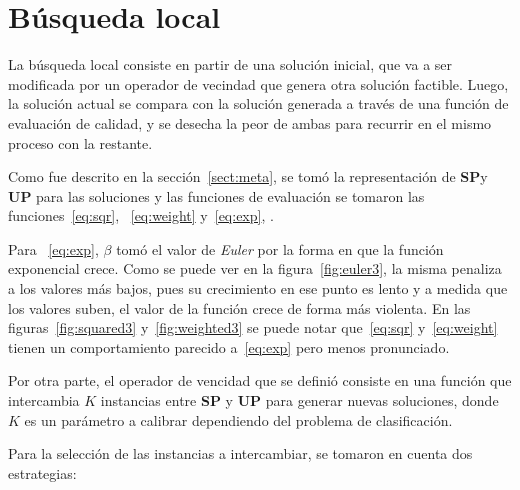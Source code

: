 \documentclass{ci5652}
\begin{document}
\section{Búsqueda local}\label{sect:ls}

La búsqueda local consiste en partir de una solución inicial, que va a ser modificada por un operador de vecindad que genera otra solución factible. Luego, la solución actual se compara con la solución generada a través de una función de evaluación de calidad, y se desecha la peor de ambas para recurrir en el mismo proceso con la restante.

Como fue descrito en la sección~\ref{sect:meta}, se tomó la representación de \textbf{SP}y \textbf{UP} para las soluciones y las funciones de evaluación se tomaron las funciones~\ref{eq:sqr}, ~\ref{eq:weight} y~\ref{eq:exp}, .

Para ~\ref{eq:exp}, $\beta$ tomó el valor de \textit{Euler} por la forma en que la función exponencial crece. Como se puede ver en la figura~\ref{fig:euler3}, la misma penaliza a los valores más bajos, pues su crecimiento en ese punto es lento y a medida que los valores suben, el valor de la función crece de forma más violenta. En las figuras~\ref{fig:squared3} y~\ref{fig:weighted3} se puede notar que~\ref{eq:sqr} y~\ref{eq:weight} tienen un comportamiento parecido a~\ref{eq:exp} pero menos pronunciado.

Por otra parte, el operador de vencidad que se definió consiste en una función que intercambia $K$ instancias entre \textbf{SP} y \textbf{UP} para generar nuevas soluciones, donde $K$ es un parámetro a calibrar dependiendo del problema de clasificación.

Para la selección de las instancias a intercambiar, se tomaron en cuenta dos estrategias:
\end{document}
